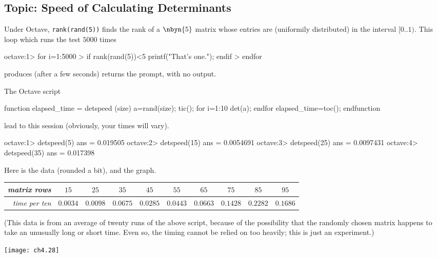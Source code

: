 \subsection{Topic: Speed of Calculating Determinants}
\begin{ans}{1}
      \begin{exparts}
        \partsitem Under Octave, \texttt{rank(rand(5))} finds the
          rank of a $\nbyn{5}$ matrix whose entries are (uniformily
          distributed) in the interval $[0..1)$.
          This loop which runs the test $5000$ times
\begin{computercode}
octave:1> for i=1:5000
> if rank(rand(5))<5 printf("That's one."); endif
> endfor
\end{computercode}
          produces (after a few seconds) returns the prompt, with no output.

          The Octave script
\begin{computercode}
function elapsed_time = detspeed (size)
  a=rand(size);
  tic();
  for i=1:10
     det(a);
  endfor
  elapsed_time=toc();
endfunction
\end{computercode}
          lead to this session (obviously, your times will vary).
\begin{computercode}
octave:1> detspeed(5)
ans = 0.019505
octave:2> detspeed(15)
ans = 0.0054691
octave:3> detspeed(25)
ans = 0.0097431
octave:4> detspeed(35)
ans = 0.017398
\end{computercode}
          \partsitem Here is the data (rounded a bit), and the graph.
            \begin{center}
              \begin{tabular}{r|ccccccccc}
                 \textit{matrix rows}
                    &$15$ &$25$ &$35$ &$45$ &$55$ &$65$ &$75$ &$85$ &$95$ \\
                 \hline
                 \textit{time per ten}
                    &$0.0034$
                    &$0.0098$
                    &$0.0675$
                    &$0.0285$
                    &$0.0443$
                    &$0.0663$
                    &$0.1428$
                    &$0.2282$
                    &$0.1686$
              \end{tabular}
            \end{center}
          (This data is from an average of twenty runs of the above script,
          because of the possibility that the randomly chosen matrix
          happens to take an unusually long or short time.
          Even so, the timing cannot be relied on too heavily; this is
          just an experiment.)
          \begin{center}
            \texttt{[image: ch4.28]}
          \end{center}
      \end{exparts}
    
\end{ans}
